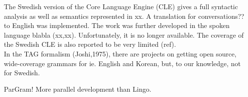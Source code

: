 \documentclass{report}
\begin{document}
The Swedish version of the Core Language Engine (CLE) \cite{gamback} %
gives a full syntactic analysis as well as semantics represented in xx. A
translation for conversations?? to English was implemented. The work was further developed in the spoken
language blabla (xx,xx). Unfortunately, it is no longer available. The coverage of the Swedish
CLE is also reported to be very limited (ref).\\

In the TAG formalism (Joshi,1975), there are projects on getting open source, wide-coverage grammars
for ie. English and Korean, but, to our knowledge, not for Swedish.  


ParGram! More parallel development than Lingo.


\end{document}
